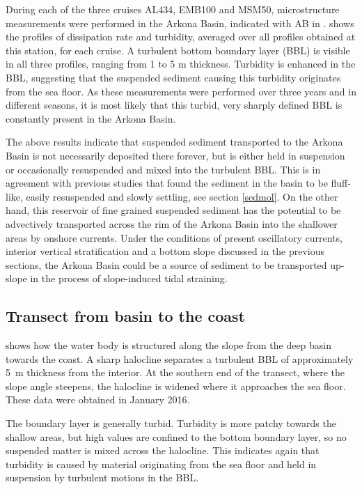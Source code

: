  During each of the three cruises AL434, EMB100 and MSM50, 
microstructure measurements were performed in the Arkona Basin, indicated with 
AB in .  shows the 
profiles of 
dissipation rate and turbidity, averaged over all profiles obtained at this 
station, for each cruise. A turbulent bottom boundary layer (BBL) is visible 
in 
all three profiles, ranging from 1 to 5 m thickness. 
Turbidity is enhanced in the BBL, suggesting that the suspended 
sediment causing this turbidity originates from the sea floor. As these 
measurements were performed over three years and in different 
seasons, it is most likely that this turbid, very sharply defined BBL is 
constantly present in the Arkona Basin.

The above results indicate that suspended sediment transported to the 
Arkona Basin is not necessarily deposited there forever, but is either held in 
suspension or occasionally resuspended and mixed into the turbulent BBL. This 
is in agreement with previous studies that found the sediment in the basin to 
be fluff-like, easily resuspended and slowly settling, see section 
\ref{sedmol}. On the other hand, this reservoir of fine grained 
suspended sediment has the potential to be advectively 
transported across the rim of the Arkona Basin into the shallower areas by 
onshore currents. Under the conditions of present oscillatory currents, 
interior vertical stratification and a bottom slope discussed in the previous 
sections, the Arkona Basin could be a source of sediment to be transported 
up-slope in the process of slope-induced tidal straining.
\FloatBarrier

\subsection{Transect from basin to the coast}

 shows how the water body is structured along the 
slope from the deep basin towards the coast. A sharp halocline separates a 
turbulent BBL of approximately 5~m thickness from the interior.  At the southern 
end of the transect, where the slope angle steepens, the halocline is widened 
where it approaches the sea floor. These data were obtained in January 2016.

The boundary layer is generally turbid. Turbidity is more patchy towards the 
shallow areas, but high values are confined to the bottom boundary layer, 
so no suspended matter is mixed across the halocline. This indicates again that 
turbidity is caused by material originating from the sea floor and held in 
suspension by turbulent motions in the BBL.
% 

